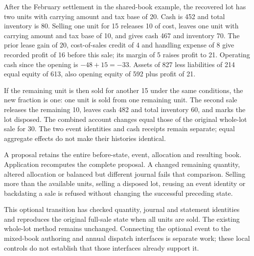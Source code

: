 After the February settlement in the shared-book example, the recovered lot
has two units with carrying amount and tax base of 20. Cash is 452 and total
inventory is 80. Selling one unit for 15 releases 10 of cost, leaves one unit
with carrying amount and tax base of 10, and gives cash 467 and inventory 70.
The prior lease gain of 20, cost-of-sales credit of 4 and handling expense of 8
give recorded profit of 16 before this sale; its margin of 5 raises profit to
21. Operating cash since the opening is $-48+15=-33$. Assets of 827 less
liabilities of 214 equal equity of 613, also opening equity of 592 plus profit
of 21.

If the remaining unit is then sold for another 15 under the same conditions,
the new fraction is one: one unit is sold from one remaining unit. The second
sale releases the remaining 10, leaves cash 482 and total inventory 60, and
marks the lot disposed. The combined account changes equal those of the
original whole-lot sale for 30. The two event identities and cash receipts
remain separate; equal aggregate effects do not make their histories identical.

A proposal retains the entire before-state, event, allocation and resulting
book. Application recomputes the complete proposal. A changed remaining
quantity, altered allocation or balanced but different journal fails that
comparison. Selling more than the available units, selling a disposed lot,
reusing an event identity or backdating a sale is refused without changing
the successful preceding state.

This optional transition has checked quantity, journal and statement identities
and reproduces the original full-sale state when all units are sold. The
existing whole-lot method remains unchanged. Connecting the optional event to
the mixed-book authoring and annual dispatch interfaces is separate work;
these local controls do not establish that those interfaces already support it.
